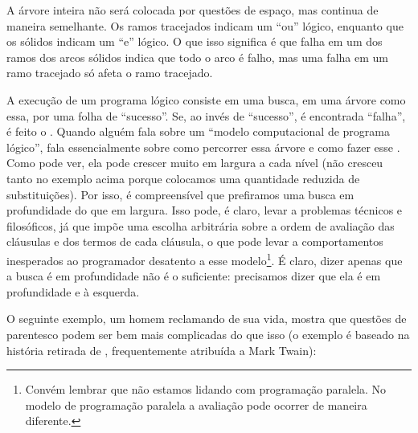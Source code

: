 \documentclass{article}
\begin{document}
A árvore inteira não será colocada por questões de espaço, mas continua de maneira semelhante. Os ramos tracejados indicam
um ``ou'' lógico, enquanto que os sólidos indicam um ``e'' lógico. O que isso significa é que falha em um dos ramos dos arcos
sólidos indica que todo o arco é falho, mas uma falha em um ramo tracejado só afeta o ramo tracejado.

A execução de um programa lógico consiste em uma busca, em uma árvore como essa, por uma folha de ``sucesso''. Se, ao invés
de ``sucesso'', é encontrada ``falha'', é feito o . Quando alguém fala sobre um ``modelo computacional de
programa lógico'', fala essencialmente sobre como percorrer essa árvore e como fazer esse .
Como pode ver, ela pode crescer muito em largura a cada nível (não cresceu tanto no exemplo acima porque colocamos uma quantidade reduzida de substituições). Por isso, é compreensível que prefiramos uma busca em profundidade
do que em largura. Isso pode, é claro, levar a problemas técnicos e filosóficos, já que impõe uma escolha arbitrária sobre a ordem
de avaliação das cláusulas e dos termos de cada cláusula, o que pode levar a comportamentos inesperados ao programador desatento a esse modelo\footnote{Convém lembrar que não estamos lidando com programação paralela.
No modelo de programação paralela a avaliação pode ocorrer de maneira
diferente.}. É claro, dizer apenas que a busca é em profundidade não é o suficiente: precisamos dizer que ela é em profundidade e
à esquerda.



O seguinte exemplo, um homem reclamando de sua vida, mostra que questões de parentesco podem ser bem
mais complicadas do que isso (o exemplo é baseado na história retirada de \cite{antoni}, frequentemente
atribuída a Mark Twain):

\end{document}

